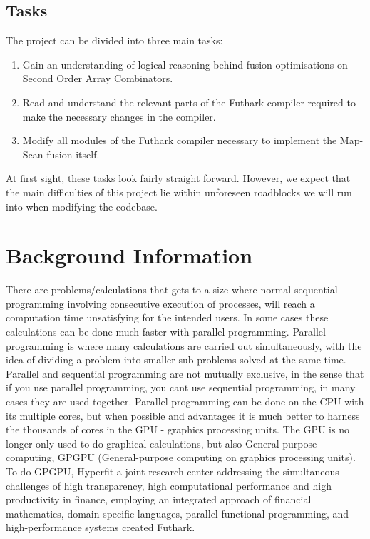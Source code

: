 \documentclass[11pt]{article}
\begin{document}
\subsection{Tasks}
The project can be divided into three main tasks:
\begin{enumerate}
    \item Gain an understanding of logical reasoning behind fusion optimisations on Second Order Array Combinators.
    \item Read and understand the relevant parts of the Futhark compiler required to make the necessary changes in the compiler.
    \item Modify all modules of the Futhark compiler necessary to implement the Map-Scan fusion itself.
\end{enumerate}
At first sight, these tasks look fairly straight forward. However, we expect that the main difficulties of this project lie within unforeseen roadblocks we will run into when modifying the codebase.

\section{Background Information}

There are problems/calculations that gets to a size where normal sequential programming involving consecutive execution of processes, will reach a computation time unsatisfying for the intended users. In some cases these calculations can be done much faster with parallel programming. Parallel programming is where many calculations are carried out simultaneously, with the idea of dividing a problem into smaller sub problems solved at the same time. Parallel and sequential programming are not mutually exclusive, in the sense that if you use parallel programming, you cant use sequential programming, in many cases they are used together. Parallel programming can be done on the CPU with its multiple cores, but when possible and advantages it is much better to harness the thousands of cores in the GPU - graphics processing units. The GPU is no longer only used to do graphical calculations, but also General-purpose computing, GPGPU (General-purpose computing on graphics processing units). \\

To do GPGPU, Hyperfit a joint research center addressing the simultaneous challenges of high transparency, high computational performance and high productivity in finance, employing an integrated approach of financial mathematics, domain specific languages, parallel functional programming, and high-performance systems \cite{Hyperfit} created Futhark. 
\end{document}
